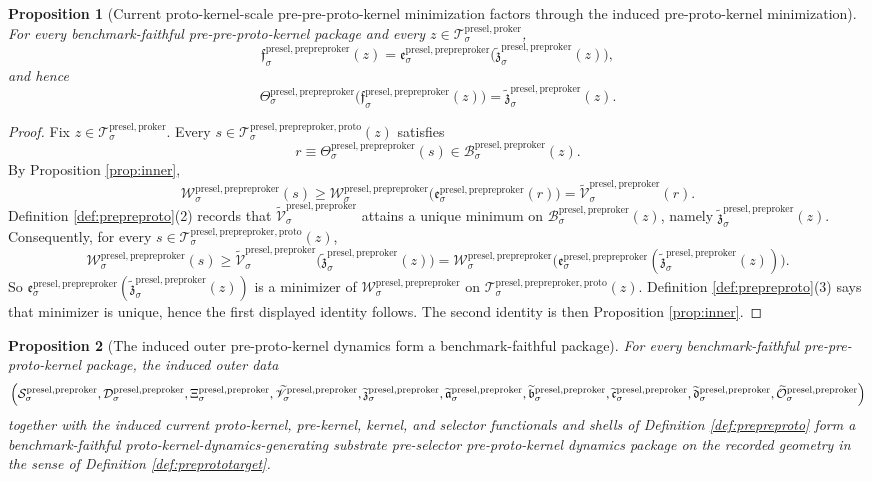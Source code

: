 \documentclass[11pt]{article}
\newcommand{\ProtoKernelBody}[1]{\mathcal T_{#1}^{\mathrm{presel,proker}}}
\newcommand{\PreProtoKernelSpace}[1]{\mathcal S_{#1}^{\mathrm{presel,preproker}}}
\newcommand{\PreProtoKernelBody}[1]{\mathcal D_{#1}^{\mathrm{presel,preproker}}}
\newcommand{\PreProtoKernelProj}[1]{\Xi_{#1}^{\mathrm{presel,preproker}}}
\newcommand{\PreProtoKernelFiber}[2]{\mathcal B_{#1}^{\mathrm{presel,preproker}}(#2)}
\newcommand{\PrePreProtoKernelProj}[1]{\Theta_{#1}^{\mathrm{presel,prepreproker}}}
\newcommand{\PrePreProtoKernelFunctional}[1]{\mathscr W_{#1}^{\mathrm{presel,prepreproker}}}
\newcommand{\PrePreProtoKernelMinLift}[1]{\mathfrak e_{#1}^{\mathrm{presel,prepreproker}}}
\newcommand{\PrePreProtoKernelProtoFiber}[2]{\mathcal T_{#1}^{\mathrm{presel,prepreproker,proto}}(#2)}
\newcommand{\PrePreProtoKernelProtoMin}[1]{\mathfrak f_{#1}^{\mathrm{presel,prepreproker}}}
\newcommand{\InducedPreProtoKernelFunctional}[1]{\widetilde{\mathscr V}_{#1}^{\mathrm{presel,preproker}}}
\newcommand{\InducedPreProtoKernelMinLift}[1]{\widetilde{\mathfrak z}_{#1}^{\mathrm{presel,preproker}}}
\newcommand{\InducedPreProtoKernelPreKernelMin}[1]{\widetilde{\mathfrak a}_{#1}^{\mathrm{presel,preproker}}}
\newcommand{\InducedPreProtoKernelKernelMin}[1]{\widetilde{\mathfrak b}_{#1}^{\mathrm{presel,preproker}}}
\newcommand{\InducedPreProtoKernelSelectorMin}[1]{\widetilde{\mathfrak c}_{#1}^{\mathrm{presel,preproker}}}
\newcommand{\InducedPreProtoKernelFullMin}[1]{\widetilde{\mathfrak d}_{#1}^{\mathrm{presel,preproker}}}
\newcommand{\InducedPreProtoKernelShell}[1]{\widetilde{\mathcal O}_{#1}^{\mathrm{presel,preproker}}}
\newtheorem{proposition}{Proposition}
\begin{document}
\begin{proposition}[Current proto-kernel-scale pre-pre-proto-kernel minimization factors through the induced pre-proto-kernel minimization]
\label{prop:protofactor}
For every benchmark-faithful pre-pre-proto-kernel package and every \(z\in\ProtoKernelBody{\sigma}\),
\[
\PrePreProtoKernelProtoMin{\sigma}(z)
=
\PrePreProtoKernelMinLift{\sigma}\bigl(\InducedPreProtoKernelMinLift{\sigma}(z)\bigr),
\]
and hence
\[
\PrePreProtoKernelProj{\sigma}\bigl(\PrePreProtoKernelProtoMin{\sigma}(z)\bigr)
=
\InducedPreProtoKernelMinLift{\sigma}(z).
\]
\end{proposition}

\begin{proof}
Fix \(z\in\ProtoKernelBody{\sigma}\). Every \(s\in\PrePreProtoKernelProtoFiber{\sigma}{z}\) satisfies
\[
r\equiv\PrePreProtoKernelProj{\sigma}(s)\in\PreProtoKernelFiber{\sigma}{z}.
\]
By Proposition \ref{prop:inner},
\[
\PrePreProtoKernelFunctional{\sigma}(s)
\geq
\PrePreProtoKernelFunctional{\sigma}\bigl(\PrePreProtoKernelMinLift{\sigma}(r)\bigr)
=
\InducedPreProtoKernelFunctional{\sigma}(r).
\]
Definition \ref{def:prepreproto}(2) records that \(\InducedPreProtoKernelFunctional{\sigma}\) attains a unique minimum on \(\PreProtoKernelFiber{\sigma}{z}\), namely \(\InducedPreProtoKernelMinLift{\sigma}(z)\). Consequently, for every \(s\in\PrePreProtoKernelProtoFiber{\sigma}{z}\),
\[
\PrePreProtoKernelFunctional{\sigma}(s)
\geq
\InducedPreProtoKernelFunctional{\sigma}\bigl(\InducedPreProtoKernelMinLift{\sigma}(z)\bigr)
=
\PrePreProtoKernelFunctional{\sigma}\bigl(\PrePreProtoKernelMinLift{\sigma}(\InducedPreProtoKernelMinLift{\sigma}(z))\bigr).
\]
So \(\PrePreProtoKernelMinLift{\sigma}(\InducedPreProtoKernelMinLift{\sigma}(z))\) is a minimizer of \(\PrePreProtoKernelFunctional{\sigma}\) on \(\PrePreProtoKernelProtoFiber{\sigma}{z}\). Definition \ref{def:prepreproto}(3) says that minimizer is unique, hence the first displayed identity follows. The second identity is then Proposition \ref{prop:inner}.
\end{proof}

\begin{proposition}[The induced outer pre-proto-kernel dynamics form a benchmark-faithful package]
\label{prop:preproto}
For every benchmark-faithful pre-pre-proto-kernel package, the induced outer data
\[
\Bigl(
\PreProtoKernelSpace{\sigma},
\PreProtoKernelBody{\sigma},
\PreProtoKernelProj{\sigma},
\InducedPreProtoKernelFunctional{\sigma},
\InducedPreProtoKernelMinLift{\sigma},
\InducedPreProtoKernelPreKernelMin{\sigma},
\InducedPreProtoKernelKernelMin{\sigma},
\InducedPreProtoKernelSelectorMin{\sigma},
\InducedPreProtoKernelFullMin{\sigma},
\InducedPreProtoKernelShell{\sigma}
\Bigr)
\]
together with the induced current proto-kernel, pre-kernel, kernel, and selector functionals and shells of Definition \ref{def:prepreproto} form a benchmark-faithful proto-kernel-dynamics-generating substrate pre-selector pre-proto-kernel dynamics package on the recorded geometry in the sense of Definition \ref{def:preprototarget}.
\end{proposition}
\end{document}
